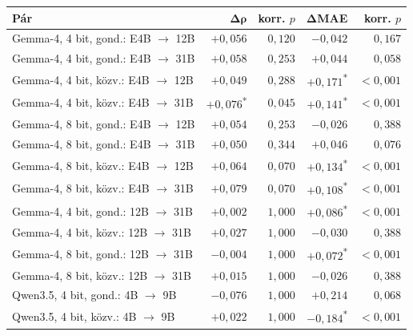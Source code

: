 \documentclass[
]{elteikthesis}[2024/04/26]
\begin{document}
\begin{table}[htbp]
	\centering
	\small
	\setlength{\tabcolsep}{4pt}
	\begin{tabular}{ | l | r | r | r | r | }
		\hline
		\textbf{Pár} & $\boldsymbol{\Delta\rho}$ & \textbf{korr. $p$} & $\boldsymbol{\Delta}$\textbf{MAE} & \textbf{korr. $p$} \\
		\hline \hline
		Gemma-4, 4 bit, gond.: E4B $\rightarrow$ 12B & $+0{,}056$ & $0{,}120$ & $-0{,}042$ & $0{,}167$ \\
		\hline
		Gemma-4, 4 bit, gond.: E4B $\rightarrow$ 31B & $+0{,}058$ & $0{,}253$ & $+0{,}044$ & $0{,}058$ \\
		\hline
		Gemma-4, 4 bit, közv.: E4B $\rightarrow$ 12B & $+0{,}049$ & $0{,}288$ & $+0{,}171$\textsuperscript{*} & $<0{,}001$ \\
		\hline
		Gemma-4, 4 bit, közv.: E4B $\rightarrow$ 31B & $+0{,}076$\textsuperscript{*} & $0{,}045$ & $+0{,}141$\textsuperscript{*} & $<0{,}001$ \\
		\hline
		Gemma-4, 8 bit, gond.: E4B $\rightarrow$ 12B & $+0{,}054$ & $0{,}253$ & $-0{,}026$ & $0{,}388$ \\
		\hline
		Gemma-4, 8 bit, gond.: E4B $\rightarrow$ 31B & $+0{,}050$ & $0{,}344$ & $+0{,}046$ & $0{,}076$ \\
		\hline
		Gemma-4, 8 bit, közv.: E4B $\rightarrow$ 12B & $+0{,}064$ & $0{,}070$ & $+0{,}134$\textsuperscript{*} & $<0{,}001$ \\
		\hline
		Gemma-4, 8 bit, közv.: E4B $\rightarrow$ 31B & $+0{,}079$ & $0{,}070$ & $+0{,}108$\textsuperscript{*} & $<0{,}001$ \\
		\hline
		Gemma-4, 4 bit, gond.: 12B $\rightarrow$ 31B & $+0{,}002$ & $1{,}000$ & $+0{,}086$\textsuperscript{*} & $<0{,}001$ \\
		\hline
		Gemma-4, 4 bit, közv.: 12B $\rightarrow$ 31B & $+0{,}027$ & $1{,}000$ & $-0{,}030$ & $0{,}388$ \\
		\hline
		Gemma-4, 8 bit, gond.: 12B $\rightarrow$ 31B & $-0{,}004$ & $1{,}000$ & $+0{,}072$\textsuperscript{*} & $<0{,}001$ \\
		\hline
		Gemma-4, 8 bit, közv.: 12B $\rightarrow$ 31B & $+0{,}015$ & $1{,}000$ & $-0{,}026$ & $0{,}388$ \\
		\hline
		Qwen3.5, 4 bit, gond.: 4B $\rightarrow$ 9B & $-0{,}076$ & $1{,}000$ & $+0{,}214$ & $0{,}068$ \\
		\hline
		Qwen3.5, 4 bit, közv.: 4B $\rightarrow$ 9B & $+0{,}022$ & $1{,}000$ & $-0{,}184$\textsuperscript{*} & $<0{,}001$ \\

\end{tabular}
\end{table}
\end{document}
